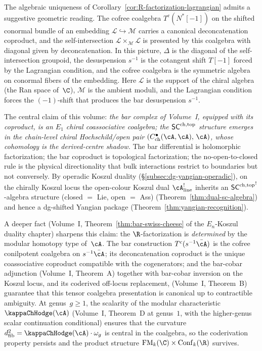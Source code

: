 \begin{remark}
\label{rem:R-factorization-lagrangian-heuristic}
The algebraic uniqueness of Corollary~\ref{cor:R-factorization-lagrangian}
admits a suggestive geometric reading. The cofree coalgebra
$T^c(N^*[-1])$ on the shifted conormal bundle of an embedding
$\mathcal L \hookrightarrow \mathcal M$ carries a canonical
deconcatenation coproduct, and the self-intersection
$\mathcal L \times_{\mathcal M} \mathcal L$ is presented by this
coalgebra with diagonal given by deconcatenation.
In this picture, $\Delta$ is the diagonal of the self-intersection
groupoid, the desuspension\/ $s^{-1}$ is the cotangent shift\/
$T[-1]$ forced by the Lagrangian condition, and the cofree coalgebra
is the symmetric algebra on conormal fibers of the embedding.
Here $\mathcal L$ is the support of the chiral algebra (the Ran
space of~$\C$), $\mathcal M$ is the ambient moduli, and the
Lagrangian condition forces the $(-1)$-shift that produces the bar
desuspension $s^{-1}$.
\end{remark}

The central claim of this volume: \emph{the bar complex of
Volume~I, equipped with its coproduct, is an $E_1$ chiral
coassociative coalgebra; the $\mathsf{SC}^{\mathrm{ch},\mathrm{top}}$ structure emerges in the
chain-level chiral Hochschild/open pair
$(C^\bullet_{\mathrm{ch}}(\cA,\cA),\, \cA)$, whose cohomology is the
derived-centre shadow.} The bar differential is holomorphic
factorization; the bar coproduct is topological factorization; the
no-open-to-closed rule is the physical directionality that bulk
interactions restrict to boundaries but not conversely. By operadic Koszul duality
(\S\ref{subsec:dg-yangian-operadic}), on the chirally Koszul locus
the open-colour Koszul dual $\cA^!_{\mathrm{line}}$ inherits an
${\mathsf{SC}^{\mathrm{ch},\mathrm{top}}}^{!}$-algebra structure (closed $=$ Lie, open $=$ Ass)
\textup{(}Theorem~\textup{\ref{thm:dual-sc-algebra}}\textup{)}
and hence a dg-shifted Yangian package
\textup{(}Theorem~\textup{\ref{thm:yangian-recognition}}\textup{)}.

A deeper fact (Volume~I,
Theorem~\ref*{thm:bar-swiss-cheese} of
the $E_n$-Koszul duality chapter) sharpens
this claim: the $\R$-factorization is \emph{determined}
by the modular homotopy type of~$\cA$. The
bar construction $T^c(s^{-1}\bar{\cA})$ is the cofree conilpotent
coalgebra on $s^{-1}\bar{\cA}$; its deconcatenation coproduct is
the unique coassociative coproduct compatible with the
cogenerators; and the bar-cobar adjunction (Volume~I, Theorem~A)
together with bar-cobar inversion on the Koszul locus, and its
coderived off-locus replacement, \textup{(}Volume~I,
Theorem~B\textup{)} guarantee
that this tensor coalgebra presentation is canonical up to
contractible ambiguity. At genus~$g \geq 1$, the scalarity of the
modular characteristic~$\kappaChHodge(\cA)$ (Volume~I, Theorem~D at
genus~$1$, with the higher-genus scalar continuation conditional) ensures
that the curvature $\dfib^2 = \kappaChHodge(\cA) \cdot \omega_g$ is
central in the coalgebra, so the coderivation property persists and
the product structure $\FM_k(\C) \times \Conf_k(\R)$ survives.

